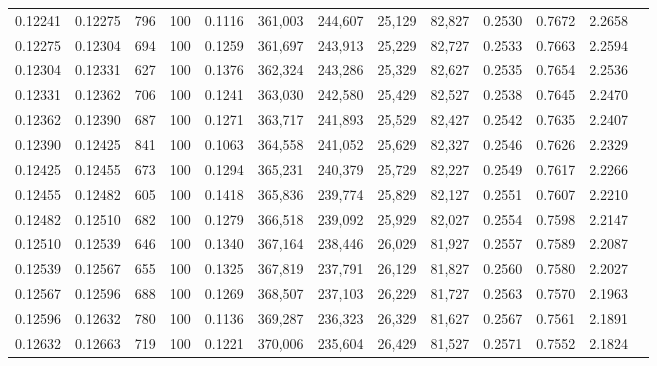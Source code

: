 \begin{tabular}{rrrrrrrrrrrrr}
0.12241 & 0.12275 &   796 & 100 &                                     0.1116 & 361,003 & 244,607 &  25,129 &  82,827 & 0.2530 & 0.7672 & 2.2658 \\
0.12275 & 0.12304 &   694 & 100 &                                     0.1259 & 361,697 & 243,913 &  25,229 &  82,727 & 0.2533 & 0.7663 & 2.2594 \\
0.12304 & 0.12331 &   627 & 100 &                                     0.1376 & 362,324 & 243,286 &  25,329 &  82,627 & 0.2535 & 0.7654 & 2.2536 \\
0.12331 & 0.12362 &   706 & 100 &                                     0.1241 & 363,030 & 242,580 &  25,429 &  82,527 & 0.2538 & 0.7645 & 2.2470 \\
0.12362 & 0.12390 &   687 & 100 &                                     0.1271 & 363,717 & 241,893 &  25,529 &  82,427 & 0.2542 & 0.7635 & 2.2407 \\
0.12390 & 0.12425 &   841 & 100 &                                     0.1063 & 364,558 & 241,052 &  25,629 &  82,327 & 0.2546 & 0.7626 & 2.2329 \\
0.12425 & 0.12455 &   673 & 100 &                                     0.1294 & 365,231 & 240,379 &  25,729 &  82,227 & 0.2549 & 0.7617 & 2.2266 \\
0.12455 & 0.12482 &   605 & 100 &                                     0.1418 & 365,836 & 239,774 &  25,829 &  82,127 & 0.2551 & 0.7607 & 2.2210 \\
0.12482 & 0.12510 &   682 & 100 &                                     0.1279 & 366,518 & 239,092 &  25,929 &  82,027 & 0.2554 & 0.7598 & 2.2147 \\
0.12510 & 0.12539 &   646 & 100 &                                     0.1340 & 367,164 & 238,446 &  26,029 &  81,927 & 0.2557 & 0.7589 & 2.2087 \\
0.12539 & 0.12567 &   655 & 100 &                                     0.1325 & 367,819 & 237,791 &  26,129 &  81,827 & 0.2560 & 0.7580 & 2.2027 \\
0.12567 & 0.12596 &   688 & 100 &                                     0.1269 & 368,507 & 237,103 &  26,229 &  81,727 & 0.2563 & 0.7570 & 2.1963 \\
0.12596 & 0.12632 &   780 & 100 &                                     0.1136 & 369,287 & 236,323 &  26,329 &  81,627 & 0.2567 & 0.7561 & 2.1891 \\
0.12632 & 0.12663 &   719 & 100 &                                     0.1221 & 370,006 & 235,604 &  26,429 &  81,527 & 0.2571 & 0.7552 & 2.1824 \\

\end{tabular}
